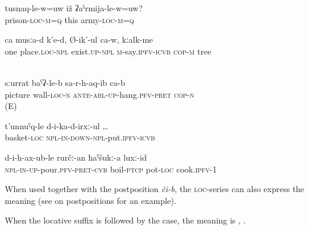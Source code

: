 %
\begin{exe}
	\ex	\label{ex:Is he in prison or in the army}
	\gll	tusnaq-le-w=uw	iž	ʡaˁrmija-le-w=uw? \\
		prison-\textsc{loc}-\textsc{m}=\textsc{q}	this		army-\textsc{loc}-\textsc{m}=\textsc{q}\\
	\glt	{}

	\ex	\label{ex:In once place, there are}
	\gll	ca	musːa-d	k'e-d,	Ø-ik'-ul ca-w,	kːalk-me\\
		one	place.\textsc{loc}-\textsc{npl}	exist.\textsc{up-npl}	\textsc{m}-say.\textsc{ipfv}-\textsc{icvb} \textsc{cop-m}	tree\\
	\glt	‎‎

	\ex	\label{ex:pic on wall_1}
	\gll	sːurrat baˁʡ-le-b sa-r-h-aq-ib ca-b\\
picture	wall-\textsc{loc-n}	\textsc{ante-abl-up}-hang.\textsc{pfv-pret}	\textsc{cop-n} \\
	\glt	{} (E)
	
	\ex	\label{ex:putting (the pears) into a basket}
	\gll	t'unnuˁq-le	d-i-ka-d-irxː-ul	\ldots\\
		basket-\textsc{loc} \textsc{npl-in-down}-\textsc{npl}-put.\textsc{ipfv}-\textsc{icvb}\\
	\glt	{}

	\ex	\label{ex:We pour (the xinkal) into a pot with boiling (water) and cook it}
	\gll	d-i-h-ax-ub-le	rurčː-an	ħaˁšukː-a	luxː-id\\
		\textsc{npl-in-up}-pour.\textsc{pfv}-\textsc{pret}-\textsc{cvb}	boil-\textsc{ptcp}	pot-\textsc{loc}		cook.\textsc{ipfv}-1\\
	\glt	{}
\end{exe}

When used together with the postposition \textit{či-b}, the \textsc{loc}-series can also express the meaning  (see  on postpositions for an example).

When the locative suffix is followed by the  case, the meaning is  , . 


